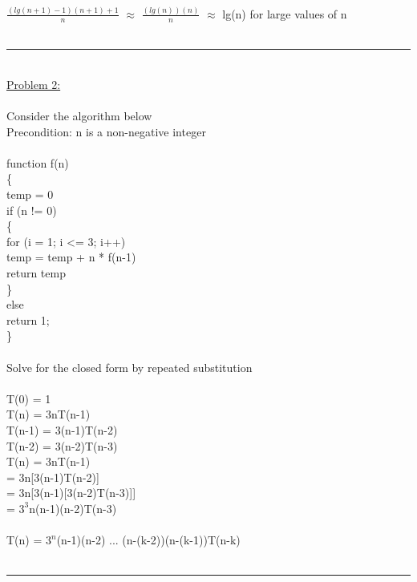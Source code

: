\documentclass{article}
\begin{document}
    \\
    \indent $\frac{(lg(n+1)-1)(n+1)+1}{n}$ $\approx$ $\frac{(lg(n))(n)}{n}$ $\approx$ lg(n) for large values of n\\\\
    \rule{\textwidth}{0.5pt}\\
    \underline{Problem 2:}\\\\
    Consider the algorithm below\\Precondition: n is a non-negative integer\\
    \\
    function f(n)\\
    \{\\
    \indent temp = 0\\
    \indent if (n != 0)\\
    \indent \{\\
    \indent \indent for (i = 1; i <= 3; i++)\\
    \indent \indent \indent temp = temp + n * f(n-1)\\
    \indent \indent return temp\\
    \indent \}\\
    \indent else\\
    \indent \indent return 1;\\
    \}\\
    \\
    Solve for the closed form by repeated substitution\\
    \\
    \indent T(0) = 1\\
    \indent T(n) = 3nT(n-1)\\
    \indent T(n-1) = 3(n-1)T(n-2)\\
    \indent T(n-2) = 3(n-2)T(n-3)\\
    \indent T(n) = 3nT(n-1)\\
    \indent\hspace{0.73cm} = 3n[3(n-1)T(n-2)]\\
    \indent\hspace{0.73cm} = 3n[3(n-1)[3(n-2)T(n-3)]]\\
    \indent\hspace{0.73cm} = $3^3$n(n-1)(n-2)T(n-3)\\
    \\
    \indent T(n) = $3^n$(n-1)(n-2) ... (n-(k-2))(n-(k-1))T(n-k)\\
    \\
    \rule{\textwidth}{0.5pt}\\
\end{document}
